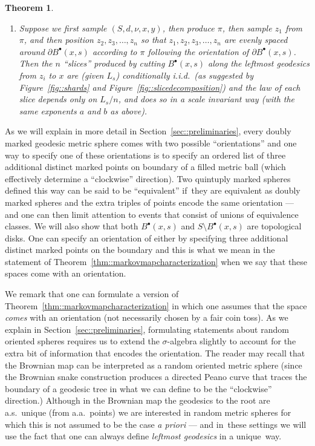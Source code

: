\documentclass[JEP,XML,SOM,Unicode]{cedram}
\newcommand{\sbullet}{{\scriptscriptstyle\bullet}}
\theoremstyle{plain}
\newtheorem{theorem}{Theorem}
\numberwithin{theorem}{section}
\theoremstyle{definition}
\newcommand{\fb}[2]{B^\sbullet(#1,#2)}
\begin{document}
\begin{theorem}
\begin{enumerate}
\begin{enumerate}
\begin{enumerate}
\item Suppose we first sample $(S,d,\nu,x,y)$, then produce $\pi$, then sample $z_1$ from $\pi$, and then position $z_2, z_3, \ldots, z_n$ so that $z_1, z_2, z_3, \ldots, z_n$ are evenly spaced around $\partial \fb{x}{s}$ according to $\pi$ following the orientation of $\partial \fb{x}{s}$. Then the $n$ ``slices'' produced by cutting $\fb{x}{s}$ along the leftmost geodesics from $z_i$ to $x$ are (given $L_s$) conditionally i.i.d.\ (as suggested by Figure~\ref{fig::shards} and Figure~\ref{fig::slicedecomposition}) and the law of each slice depends only on $L_s/n$, and does so in a scale invariant way (with the same exponents $a$ and $b$ as above).
\end{enumerate}
\end{enumerate}
\end{enumerate}
\end{theorem}

As we will explain in more detail in Section~\ref{sec::preliminaries}, every doubly marked geodesic metric sphere comes with two possible ``orientations'' and one way to specify one of these orientations is to specify an ordered list of three additional distinct marked points on boundary of a filled metric ball (which effectively determine a ``clockwise'' direction). Two quintuply marked spheres defined this way can be said to be ``equivalent'' if~they are equivalent as doubly marked spheres and the extra triples of points encode the same orientation --- and one can then limit attention to events that consist of unions of equivalence classes. We will also show that both $\fb{x}{s}$ and $S \setminus \fb{x}{s}$ are topological disks. One can specify an orientation of either by specifying three additional distinct marked points on the boundary and this is what we mean in the statement of Theorem~\ref{thm::markovmapcharacterization} when we say that these spaces come with an orientation.

We remark that one can formulate a version of Theorem~\ref{thm::markovmapcharacterization} in which one assumes that the space \emph{comes} with an orientation (not necessarily chosen by a fair coin toss). As we explain in Section~\ref{sec::preliminaries}, formulating statements about random oriented spheres requires us to extend the $\sigma$-algebra slightly to account for the extra bit of information that encodes the orientation. The reader may recall that the Brownian map can be interpreted as a random oriented metric sphere (since the Brownian snake construction produces a directed Peano curve that traces the boundary of a geodesic tree in what we can define to be the ``clockwise'' direction.) Although in the Brownian map the geodesics to the root are a.s.\ unique (from a.a.\ points) we are interested in random metric spheres for which this is not assumed to be the case \emph{a priori} --- and in~these settings we will use the fact that one can always define \emph{leftmost geodesics} in a unique~way.
\end{document}
